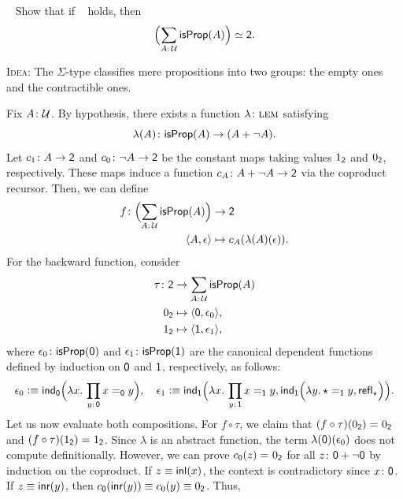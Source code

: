 \begin{exr}\ua\ \fe\label{exr:Lem-implies-2-props}
    Show that if\/ \Lem\ {} holds, then
    \[
        \Bigl(\sum_{A\colon\univ}\fun{isProp}(A)\Bigr)\simeq\fun2.
    \]
\end{exr}

\begin{solution}
    \textsc{Idea:} The $\Sigma$-type classifies mere propositions into two groups: the empty ones and the contractible ones.
    
    Fix $A\colon\univ$. By hypothesis, there exists a function $\lambda\colon\Lem$ satisfying
    \[
        \lambda(A)\colon\fun{isProp}(A)\to(A+\neg A).
    \]
    Let $c_1\colon A\to\fun2$ and $c_0\colon\neg A\to\fun2$ be the constant maps taking values $1_{\mathsf{2}}$ and $0_{\mathsf{2}}$, respectively. These maps induce a function $c_A\colon A+\neg A\to\fun2$ via the coproduct recursor. Then, we can define
    \begin{align*}
        f\colon\Bigl(\sum_{A\colon\univ}\fun{isProp}(A)\Bigr)
            &\to\fun2\\
        \dep{A,\epsilon}&\mapsto c_A(\lambda(A)(\epsilon)).
    \end{align*}
    For the backward function, consider
    \begin{align*}
        \tau\colon\fun2&\to\sum_{A\colon\univ}\fun{isProp}(A)\\
        0_{\fun2}&\mapsto\dep{\fun0,\epsilon_0},\\
        1_{\fun2}&\mapsto\dep{\fun1,\epsilon_1},
    \end{align*}
    where $\epsilon_0\colon\fun{isProp}(\fun0)$ and $\epsilon_1\colon\fun{isProp}(\fun1)$ are the canonical dependent functions defined by induction on $\mathsf{0}$ and $\mathsf{1}$, respectively, as follows:
    \[
        \epsilon_0\defeq\fun{ind}_{\fun0}
            \Bigl(
                \lambda x.\,\prod_{y\colon\fun0}x\eq{\fun0}y
            \Bigr),\quad
        \epsilon_1\defeq\fun{ind}_{\fun1}
            \Bigl(
                \lambda x.\,\prod_{y\colon\fun1}x\eq{\fun1}y,
                \fun{ind}_{\fun1}
                    \Bigl(
                        \lambda y.\,\star\eq{\fun1}y,
                        \fun{refl}_{\star}
                    \Bigr)
            \Bigr).
    \]
    Let us now evaluate both compositions. For $f\circ\tau$, we claim that $(f\circ\tau)(0_{\mathsf{2}})\mathrel{=_{}}0_{\mathsf{2}}$ and $(f\circ\tau)(1_{\mathsf{2}})\mathrel{=_{}}1_{\mathsf{2}}$. Since $\lambda$ is an abstract function, the term $\lambda(\mathsf{0})(\epsilon_0)$ does not compute definitionally. However, we can prove $c_{\mathsf{0}}(z)\mathrel{=_{}}0_{\mathsf{2}}$ for all $z\colon\fun0+\neg\fun0$ by induction on the coproduct. If $z\equiv\mathsf{inl}(x)$, the context is contradictory since $x\colon\fun0$. If $z\equiv\mathsf{inr}(y)$, then $c_{\mathsf{0}}(\mathsf{inr}(y))\equiv c_0(y)\equiv 0_{\mathsf{2}}$. Thus,

\end{solution}
